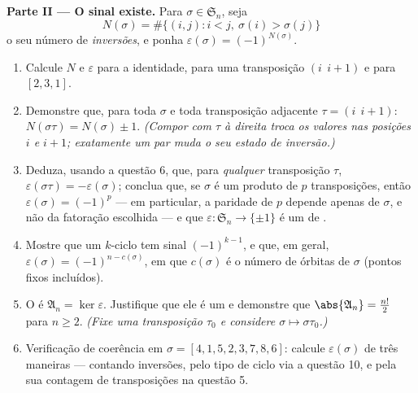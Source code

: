 \begin{problem}
\medskip
\noindent\textbf{Parte II --- O sinal existe.} Para $\sigma
\in \mathfrak S_n$, seja
\[
N(\sigma) = \#\bigl\{(i, j) : i < j,\ \sigma(i) >
\sigma(j)\bigr\}
\]
o seu número de \emph{inversões}, e ponha $\varepsilon(\sigma) =
(-1)^{N(\sigma)}$.
\begin{enumerate}
  \item Calcule $N$ e $\varepsilon$ para a identidade, para uma
        transposição $(i\ \ i{+}1)$ e para $[2, 3, 1]$.
  \item Demonstre que, para toda $\sigma$ e toda transposição
        adjacente $\tau = (i\ \ i{+}1)$:
        $N(\sigma\tau) = N(\sigma) \pm 1$. \emph{(Compor com
        $\tau$ à direita troca os valores nas posições $i$ e
        $i + 1$; exatamente um par muda o seu estado de
        inversão.)}
  \item Deduza, usando a questão 6, que, para \emph{qualquer}
        transposição $\tau$, $\varepsilon(\sigma\tau) =
        -\varepsilon(\sigma)$; conclua que, se $\sigma$ é um
        produto de $p$ transposições, então $\varepsilon(\sigma)
        = (-1)^p$ --- em particular, a paridade de $p$ depende apenas
        de $\sigma$, e não da fatoração escolhida --- e que
        $\varepsilon \colon \mathfrak S_n \to \{\pm 1\}$ é um
         de .
  \item Mostre que um $k$-ciclo tem sinal $(-1)^{k-1}$, e que,
        em geral, $\varepsilon(\sigma) = (-1)^{n -
        c(\sigma)}$, em que $c(\sigma)$ é o número de órbitas de
        $\sigma$ (pontos fixos incluídos).
  \item O \emph{} é $\mathfrak A_n =
        \ker\varepsilon$. Justifique que ele é um  e demonstre que
        $\abs{\mathfrak A_n} = \frac{n!}2$ para $n \geq 2$.
        \emph{(Fixe uma transposição $\tau_0$ e considere $\sigma
        \mapsto \sigma\tau_0$.)}
  \item Verificação de coerência em $\sigma = [4, 1, 5, 2, 3, 7, 8, 6]$:
        calcule $\varepsilon(\sigma)$ de três maneiras --- contando
        inversões, pelo tipo de ciclo via a questão 10, e pela sua
        contagem de transposições na questão 5.
\end{enumerate}


\end{problem}
